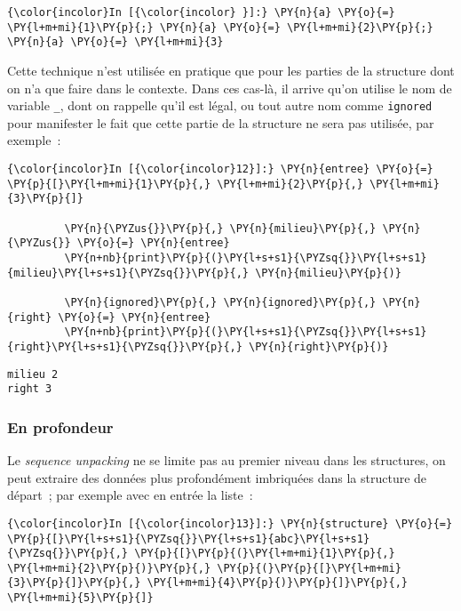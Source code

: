     \begin{Verbatim}[commandchars=\\\{\}]
{\color{incolor}In [{\color{incolor} }]:} \PY{n}{a} \PY{o}{=} \PY{l+m+mi}{1}\PY{p}{;} \PY{n}{a} \PY{o}{=} \PY{l+m+mi}{2}\PY{p}{;} \PY{n}{a} \PY{o}{=} \PY{l+m+mi}{3}
\end{Verbatim}


    Cette technique n'est utilisée en pratique que pour les parties de la
structure dont on n'a que faire dans le contexte. Dans ces cas-là, il
arrive qu'on utilise le nom de variable \texttt{\_}, dont on rappelle
qu'il est légal, ou tout autre nom comme \texttt{ignored} pour
manifester le fait que cette partie de la structure ne sera pas
utilisée, par exemple~:

    \begin{Verbatim}[commandchars=\\\{\}]
{\color{incolor}In [{\color{incolor}12}]:} \PY{n}{entree} \PY{o}{=} \PY{p}{[}\PY{l+m+mi}{1}\PY{p}{,} \PY{l+m+mi}{2}\PY{p}{,} \PY{l+m+mi}{3}\PY{p}{]}
         
         \PY{n}{\PYZus{}}\PY{p}{,} \PY{n}{milieu}\PY{p}{,} \PY{n}{\PYZus{}} \PY{o}{=} \PY{n}{entree}
         \PY{n+nb}{print}\PY{p}{(}\PY{l+s+s1}{\PYZsq{}}\PY{l+s+s1}{milieu}\PY{l+s+s1}{\PYZsq{}}\PY{p}{,} \PY{n}{milieu}\PY{p}{)}
         
         \PY{n}{ignored}\PY{p}{,} \PY{n}{ignored}\PY{p}{,} \PY{n}{right} \PY{o}{=} \PY{n}{entree}
         \PY{n+nb}{print}\PY{p}{(}\PY{l+s+s1}{\PYZsq{}}\PY{l+s+s1}{right}\PY{l+s+s1}{\PYZsq{}}\PY{p}{,} \PY{n}{right}\PY{p}{)}
\end{Verbatim}


    \begin{Verbatim}[commandchars=\\\{\}]
milieu 2
right 3

    \end{Verbatim}

    \hypertarget{en-profondeur}{%
\subsubsection{En profondeur}\label{en-profondeur}}

    Le \emph{sequence unpacking} ne se limite pas au premier niveau dans les
structures, on peut extraire des données plus profondément imbriquées
dans la structure de départ~; par exemple avec en entrée la liste~:

    \begin{Verbatim}[commandchars=\\\{\}]
{\color{incolor}In [{\color{incolor}13}]:} \PY{n}{structure} \PY{o}{=} \PY{p}{[}\PY{l+s+s1}{\PYZsq{}}\PY{l+s+s1}{abc}\PY{l+s+s1}{\PYZsq{}}\PY{p}{,} \PY{p}{[}\PY{p}{(}\PY{l+m+mi}{1}\PY{p}{,} \PY{l+m+mi}{2}\PY{p}{)}\PY{p}{,} \PY{p}{(}\PY{p}{[}\PY{l+m+mi}{3}\PY{p}{]}\PY{p}{,} \PY{l+m+mi}{4}\PY{p}{)}\PY{p}{]}\PY{p}{,} \PY{l+m+mi}{5}\PY{p}{]}
\end{Verbatim}


